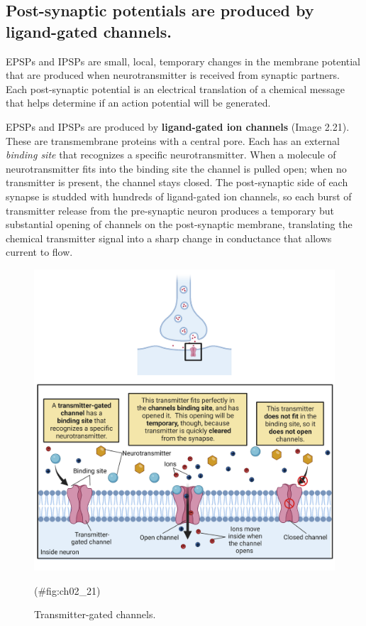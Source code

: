 \documentclass[
]{book}
\begin{document}
\hypertarget{post-synaptic-potentials-are-produced-by-ligand-gated-channels.}{%
\subsection{Post-synaptic potentials are produced by ligand-gated channels.}\label{post-synaptic-potentials-are-produced-by-ligand-gated-channels.}}

EPSPs and IPSPs are small, local, temporary changes in the membrane potential that are produced when neurotransmitter is received from synaptic partners. Each post-synaptic potential is an electrical translation of a chemical message that helps determine if an action potential will be generated.

EPSPs and IPSPs are produced by \textbf{ligand-gated ion channels }(Image 2.21). These are transmembrane proteins with a central pore. Each has an external \emph{binding site} that recognizes a specific neurotransmitter. When a molecule of neurotransmitter fits into the binding site the channel is pulled open; when no transmitter is present, the channel stays closed. The post-synaptic side of each synapse is studded with hundreds of ligand-gated ion channels, so each burst of transmitter release from the pre-synaptic neuron produces a temporary but substantial opening of channels on the post-synaptic membrane, translating the chemical transmitter signal into a sharp change in conductance that allows current to flow.

\begin{figure}

{\centering \includegraphics[width=0.8\linewidth]{images/ch02/02_21} 

}

\caption{Transmitter-gated channels.}(\#fig:ch02_21)
\end{figure}
\end{document}
